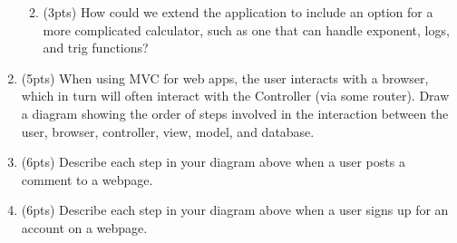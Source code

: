 \documentclass[11pt]{article}
\newlength{\up}\setlength{\up}{-\baselineskip}
\begin{document}
\begin{enumerate}
\begin{enumerate}
      \vfill
      \vfill

      \item (3pts) How could we extend the application to include an option for a more complicated calculator, such as one that can handle exponent, logs, and trig functions?

      \vspace{0.5in}

    \end{enumerate}

  \item (5pts) When using MVC for web apps, the user interacts with a browser, which in turn will often interact with the Controller (via some router). Draw a diagram showing the order of steps involved in the interaction between the user, browser, controller, view, model, and database. 

  \vfill
  \vfill

  \item (6pts) Describe each step in your diagram above when a user posts a comment to a webpage.

  \vfill
  \vfill
  \vfill

  \item (6pts) Describe each step in your diagram above when a user signs up for an account on a webpage. 

  \vfill
  \vfill
  \vfill

\end{enumerate}
\end{document}
